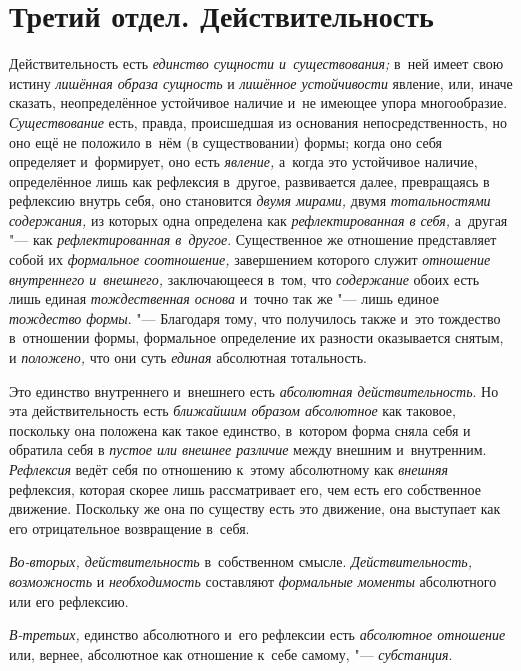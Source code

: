 \chapter[{\em Третий отдел.} ДЕЙСТВИТЕЛЬНОСТЬ]%
{Третий отдел. Действительность}

Действительность есть {\em единство сущности и~существования;} в~ней имеет
свою истину {\em лишённая образа сущность} и
{\em лишённое устойчивости} явление, или, иначе
сказать, неопределённое устойчивое наличие и~не имеющее упора многообразие.
{\em Существование} есть, правда, происшедшая из
основания непосредственность, но оно ещё не положило в~нём (в
существовании) формы; когда оно себя определяет и~формирует, оно есть
{\em явление,} а~когда это устойчивое наличие,
определённое лишь как рефлексия в~другое, развивается далее, превращаясь в
рефлексию внутрь себя, оно становится {\em двумя
мирами,} двумя {\em тотальностями содержания,} из
которых одна определена как {\em рефлектированная в
себя,} а~другая "--- как {\em рефлектированная в~другое}.
Существенное же отношение представляет собой их
{\em формальное соотношение,} завершением которого
служит {\em отношение внутреннего и~внешнего,}
заключающееся в~том, что {\em содержание} обоих есть
лишь единая {\em тождественная основа} и~точно так же
"--- лишь единое {\em тождество формы}. "--- Благодаря тому,
что получилось также и~это тождество в~отношении формы, формальное
определение их разности оказывается снятым, и
{\em положено,} что они суть {\em единая} абсолютная тотальность.

Это единство внутреннего и~внешнего есть {\em абсолютная
действительность}. Но эта действительность есть
{\em ближайшим образом абсолютное} как таковое,
поскольку она положена как такое единство, в~котором форма сняла себя и
обратила себя в {\em пустое или внешнее различие} между
внешним и~внутренним. {\em Рефлексия} ведёт себя по
отношению к~этому абсолютному как {\em внешняя}
рефлексия, которая скорее лишь рассматривает его, чем есть его собственное
движение. Поскольку же она по существу есть это движение, она выступает как
его отрицательное возвращение в~себя.

{\em Во-вторых, действительность} в~собственном смысле.
{\em Действительность, возможность} и {\em необходимость} составляют
{\em формальные моменты} абсолютного или его рефлексию.

{\em В-третьих,} единство абсолютного и~его рефлексии
есть {\em абсолютное отношение} или, вернее, абсолютное
как отношение к~себе самому, "--- {\em субстанция}.

